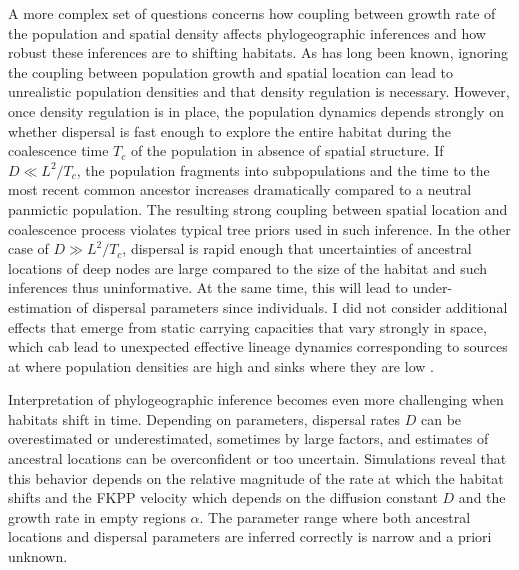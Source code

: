 \documentclass[aps,rmp, twocolumn]{revtex4}
\begin{document}
A more complex set of questions concerns how coupling between growth rate of the population and spatial density affects phylogeographic inferences and how robust these inferences are to shifting habitats.
As has long been known, ignoring the coupling between population growth and spatial location can lead to unrealistic population densities \citep{felsenstein_pain_1975} and that density regulation is necessary.
However, once density regulation is in place, the population dynamics depends strongly on whether dispersal is fast enough to explore the entire habitat during the coalescence time $T_c$ of the population in absence of spatial structure.
If $D\ll L^2/T_c$, the population fragments into subpopulations and the time to the most recent common ancestor increases dramatically compared to a neutral panmictic population.
The resulting strong coupling between spatial location and coalescence process violates typical tree priors used in such inference.
In the other case of $D\gg L^2/T_c$, dispersal is rapid enough that uncertainties of ancestral locations of deep nodes are large compared to the size of the habitat and such inferences thus uninformative.
At the same time, this will lead to under-estimation of dispersal parameters since individuals.
I did not consider additional effects that emerge from static carrying capacities that vary strongly in space, which cab lead to unexpected effective lineage dynamics corresponding to sources at where population densities are high and sinks where they are low \citep{wilkins_coalescent_2002}.

Interpretation of phylogeographic inference becomes even more challenging when habitats shift in time.
Depending on parameters, dispersal rates $D$ can be overestimated or underestimated, sometimes by large factors, and estimates of ancestral locations can be overconfident or too uncertain.
Simulations reveal that this behavior depends on the relative magnitude of the rate at which the habitat shifts and the FKPP velocity which depends on the diffusion constant $D$ and the growth rate in empty regions $\alpha$.
The parameter range where both ancestral locations and dispersal parameters are inferred correctly is narrow and a priori unknown.
\end{document}
